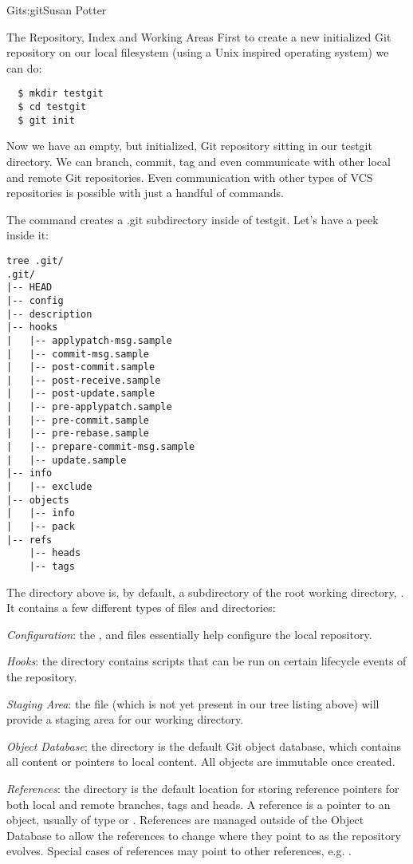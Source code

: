 \begin{aosachapter}{Git}{s:git}{Susan Potter}
\begin{aosasect1}{The Repository, Index and Working Areas}
First to create a new initialized Git repository on our local filesystem
(using a Unix inspired operating system) we can do:
\begin{verbatim}
  $ mkdir testgit
  $ cd testgit
  $ git init
\end{verbatim}

Now we have an empty, but initialized, Git repository sitting in our testgit
directory. We can branch, commit, tag and even communicate with other local
and remote Git repositories. Even communication with other types of VCS
repositories is possible with just a handful of  commands.

The  command creates a .git subdirectory inside of testgit.
Let's have a peek inside it:
\begin{verbatim}
tree .git/
.git/
|-- HEAD
|-- config
|-- description
|-- hooks
|   |-- applypatch-msg.sample
|   |-- commit-msg.sample
|   |-- post-commit.sample
|   |-- post-receive.sample
|   |-- post-update.sample
|   |-- pre-applypatch.sample
|   |-- pre-commit.sample
|   |-- pre-rebase.sample
|   |-- prepare-commit-msg.sample
|   |-- update.sample
|-- info
|   |-- exclude
|-- objects
|   |-- info
|   |-- pack
|-- refs
    |-- heads
    |-- tags
\end{verbatim}

The  directory above is, by default, a subdirectory of the root working
directory, . It contains a few different types of files and
directories:

\begin{aosaitemize}
  \item \emph{Configuration}: the ,  and
   files essentially help configure the local repository.
  \item \emph{Hooks}: the  directory contains scripts that can
  be run on certain lifecycle events of the repository.
  \item \emph{Staging Area}: the  file (which is not yet
  present in our tree listing above) will provide a staging area for our
  working directory.
  \item \emph{Object Database}: the  directory is the default
  Git object database, which contains all content or pointers to local
  content. All objects are immutable once created.
  \item \emph{References}: the  directory is the default location
  for storing reference pointers for both local and remote branches, tags and
  heads. A reference is a pointer to an object, usually of type  or
  . References are managed outside of the Object Database to
  allow the references to change where they point to as the repository
  evolves. Special cases of references may point to other references, e.g.
  .
\end{aosaitemize}


\end{aosasect1}
\end{aosachapter}
